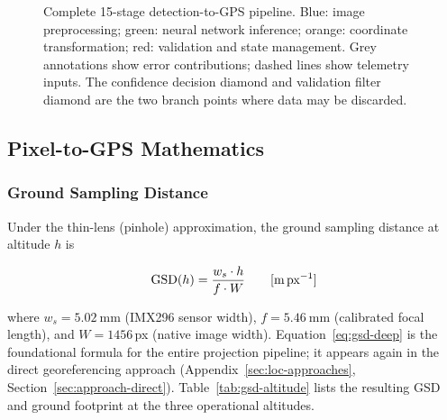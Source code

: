 \begin{figure}[H]
  \caption{Complete 15-stage detection-to-GPS pipeline.  Blue: image preprocessing; green: neural network inference; orange: coordinate transformation; red: validation and state management.  Grey annotations show error contributions; dashed lines show telemetry inputs.  The confidence decision diamond and validation filter diamond are the two branch points where data may be discarded.}
  \label{fig:pipeline-flow}
\end{figure}

\subsection{Pixel-to-GPS Mathematics}\label{sec:gps-math}

\subsubsection{Ground Sampling Distance}

Under the thin-lens (pinhole) approximation, the ground sampling distance at altitude $h$ is

\begin{equation}\label{eq:gsd-deep}
  \mathrm{GSD}(h) = \frac{w_s \cdot h}{f \cdot W}
  \qquad [\text{m\,px}^{-1}]
\end{equation}

\noindent where $w_s = \SI{5.02}{\milli\metre}$ (IMX296 sensor width), $f = \SI{5.46}{\milli\metre}$ (calibrated focal length), and $W = 1456$\,px (native image width).  Equation~\ref{eq:gsd-deep} is the foundational formula for the entire projection pipeline; it appears again in the direct georeferencing approach (Appendix~\ref{sec:loc-approaches}, Section~\ref{sec:approach-direct}).  Table~\ref{tab:gsd-altitude} lists the resulting GSD and ground footprint at the three operational altitudes.

